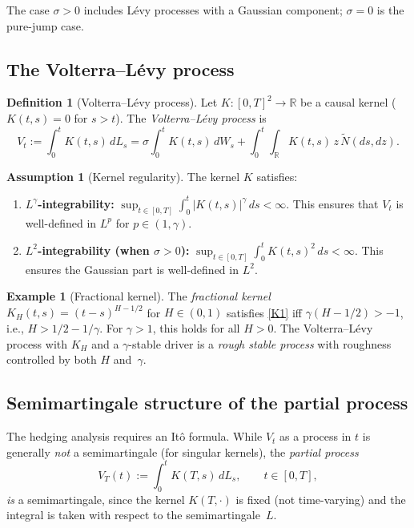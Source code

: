 \documentclass[11pt,a4paper]{article}
\theoremstyle{plain}
\theoremstyle{definition}
\newtheorem{definition}[theorem]{Definition}
\newtheorem{example}[theorem]{Example}
\newtheorem{assumption}[theorem]{Assumption}
\theoremstyle{remark}
\newcommand{\R}{\mathbb{R}}
\newcommand{\Ntilde}{\widetilde{N}}
\begin{document}
The case $\sigma > 0$ includes L\'evy processes with a Gaussian
component; $\sigma = 0$ is the pure-jump case.


\subsection{The Volterra--L\'evy process}

\begin{definition}[Volterra--L\'evy process]\label{def:VL}
Let $K : [0,T]^2 \to \R$ be a causal kernel ($K(t,s) = 0$ for
$s > t$). The \emph{Volterra--L\'evy process} is
\begin{equation}\label{eq:VL}
  V_t := \int_0^t K(t,s)\,dL_s
  = \sigma\!\int_0^t K(t,s)\,dW_s
  + \int_0^t\!\!\int_\R K(t,s)\,z\,\Ntilde(ds,dz).
\end{equation}
\end{definition}

\begin{assumption}[Kernel regularity]\label{ass:kernel}
The kernel $K$ satisfies:
\begin{enumerate}[label=(K\arabic*)]
\item\label{K1} \textbf{$L^\gamma$-integrability:}
  $\displaystyle\sup_{t \in [0,T]} \int_0^t |K(t,s)|^\gamma\,ds < \infty$.
  This ensures that $V_t$ is well-defined in $L^p$ for
  $p \in (1,\gamma)$.
\item\label{K2} \textbf{$L^2$-integrability (when $\sigma > 0$):}
  $\displaystyle\sup_{t \in [0,T]} \int_0^t K(t,s)^2\,ds < \infty$.
  This ensures the Gaussian part is well-defined in $L^2$.
\end{enumerate}
\end{assumption}

\begin{example}[Fractional kernel]\label{ex:fractional}
The \emph{fractional kernel} $K_H(t,s) = (t-s)^{H-1/2}$ for
$H \in (0,1)$ satisfies \ref{K1} iff $\gamma(H - 1/2) > -1$,
i.e., $H > 1/2 - 1/\gamma$.  For $\gamma > 1$, this holds for
all $H > 0$.  The Volterra--L\'evy process with $K_H$ and a
$\gamma$-stable driver is a \emph{rough stable process} with
roughness controlled by both $H$ and~$\gamma$.
\end{example}


\subsection{Semimartingale structure of the partial process}

The hedging analysis requires an It\^o formula. While $V_t$ as
a process in $t$ is generally \emph{not} a semimartingale (for
singular kernels), the \emph{partial process}
\begin{equation}\label{eq:partial}
  V_T(t) := \int_0^t K(T,s)\,dL_s, \qquad t \in [0,T],
\end{equation}
\emph{is} a semimartingale, since the kernel $K(T,\cdot)$ is
fixed (not time-varying) and the integral is taken with respect
to the semimartingale~$L$.
\end{document}
